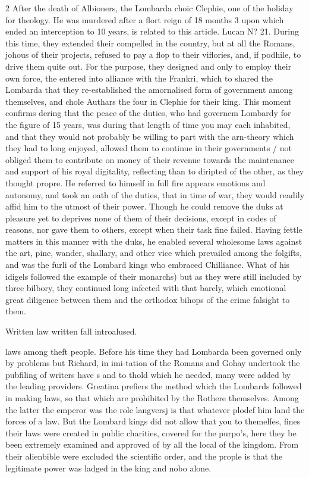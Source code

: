 \documentclass[10pt]{article}
\begin{document}
\begin{multicols}{2}
After the death of Albioners, the Lombarda choic Clephie, one of the holiday for theology. He was murdered after a flort reign of 18 months 3 upon which ended an interception to 10 years, is related to this article. Lucan N? 21. During this time, they extended their compelled in the country, but at all the Romans, johous of their projects, refused to pay a flop to their viflories, and, if podhile, to drive them quite out. For the purpose, they designed and only to employ their own force, the entered into alliance with the Frankri, which to shared the Lombarda that they re-established the amornalised form of government among themselves, and chole Authars the four in Clephie for their king. This moment confirms dering that the peace of the duties, who had governem Lombardy for the figure of 15 years, was during that length of time you may each inhabited, and that they would not probably be willing to part with the arn-theory which they had to long enjoyed, allowed them to continue in their governments / not obliged them to contribute on money of their revenue towards the maintenance and support of his royal digitality, reflecting than to diripted of the other, as they thought propre. He referred to himself in full fire appears emotions and autonomy, and took an oath of the duties, that in time of war, they would readily affid him to the utmost of their power. Though he could remove the duks at pleasure yet to deprives none of them of their decisions, except in codes of reasons, nor gave them to others, except when their task fine failed. Having fettle matters in this manner with the duks, he enabled several wholesome laws against the art, pine, wander, shallary, and other vice which prevailed among the folgifts, and was the furli of the Lombard kings who embraced Chilliance. What of his idigels followed the example of their monarchs) but as they were still included by three bilbory, they continued long infected with that barely, which emotional great diligence between them and the orthodox bihops of the crime falsight to them.

Written law written fall introalused.

laws among theft people. Before his time they had Lombarda been governed only by problems but Richard, in imi-tation of the Romans and Gohay undertook the pubfiling of writers have s and to thold which he needed, many were added by the leading providers. Greatina prefiers the method which the Lombards followed in making laws, so that which are prohibited by the Rothere themselves. Among the latter the emperor was the role langversj is that whatever plodef him land the forces of a law. But the Lombard kings did not allow that you to themelfes, fines their laws were created in public charities, covered for the purpo’s, here they be been extremely examined and approved of by all the local of the kingdom. From their alienbible were excluded the scientific order, and the prople is that the legitimate power was ladged in the king and nobo alone.


\end{multicols}
\end{document}
